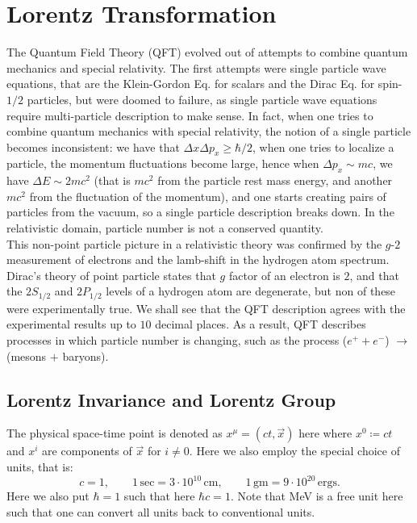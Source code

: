 \documentclass[11pt, onesided]{book}
\theoremstyle{break}
\theoremstyle{break}
\begin{document}
\tableofcontents
\hfill\break
\hfill\break
\hfill\break
 


\newpage
\chapter{Lorentz Transformation}
\quad The Quantum Field Theory (QFT) evolved out of attempts to combine quantum mechanics and special relativity. The first attempts were single particle wave equations, that are the Klein-Gordon Eq. for scalars and the Dirac Eq. for spin-$1/2$ particles, but were doomed to failure, as single particle wave equations require multi-particle description to make sense. In fact, when one tries to combine quantum mechanics with special relativity, the notion of a single particle becomes inconsistent: we have that $\Delta x \Delta p_x \geq \hbar/2$, when one tries to localize a particle, the momentum fluctuations become large, hence when $\Delta p_x \sim mc$, we have $\Delta E \sim 2mc^2$ (that is $mc^2$ from the particle rest mass energy, and another $mc^2$ from the fluctuation of the momentum), and one starts creating pairs of particles from the vacuum, so a single particle description breaks down. In the relativistic domain, particle number is not a conserved quantity. \\

\quad This non-point particle picture in a relativistic theory was confirmed by the $g$-$2$ measurement of electrons and the lamb-shift in the hydrogen atom spectrum. Dirac's theory of point particle states that $g$ factor of an electron is $2$, and that the $2S_{1/2}$ and $2P_{1/2}$ levels of a hydrogen atom are degenerate, but non of these were experimentally true. We shall see that the QFT description agrees with the experimental results up to $10$ decimal places. As a result, QFT describes processes in which particle number is changing, such as the process ($e^+ + e^-$) $\to$ (mesons $+$ baryons). 
\hfill\break
\hfill\break
\hfill\break
\section[Lorentz Invariance and Lorentz Group]{\color{red}Lorentz Invariance and Lorentz Group\color{black}}
The physical space-time point is denoted as $x^\mu = (ct, \vec{x})$ here where $x^0\coloneqq ct$ and $x^i$ are components of $\vec{x}$ for $i \neq 0$. Here we also employ the special choice of units, that is: 
$$c=1, \qquad 1\,\text{sec} =3\cdot 10^{10}\,\text{cm},\qquad 1\,\text{gm}=9\cdot 10^{20}\,\text{ergs}.$$ 
Here we also put $\hbar = 1$ such that here $\hbar c = 1$. Note that MeV is a free unit here such that one can convert all units back to conventional units. \\
\end{document}
